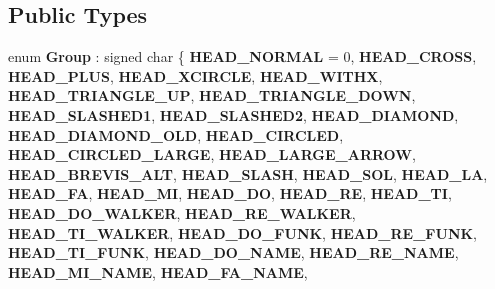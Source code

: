\subsection*{Public Types}
\begin{DoxyCompactItemize}
\item 
\mbox{\label{class_ms_1_1_note_head_a1d3e8faf3d3bc1d89d9d3485acde69d1}} 
enum {\bfseries Group} \+: signed char \{ \newline
{\bfseries H\+E\+A\+D\+\_\+\+N\+O\+R\+M\+AL} = 0, 
{\bfseries H\+E\+A\+D\+\_\+\+C\+R\+O\+SS}, 
{\bfseries H\+E\+A\+D\+\_\+\+P\+L\+US}, 
{\bfseries H\+E\+A\+D\+\_\+\+X\+C\+I\+R\+C\+LE}, 
\newline
{\bfseries H\+E\+A\+D\+\_\+\+W\+I\+T\+HX}, 
{\bfseries H\+E\+A\+D\+\_\+\+T\+R\+I\+A\+N\+G\+L\+E\+\_\+\+UP}, 
{\bfseries H\+E\+A\+D\+\_\+\+T\+R\+I\+A\+N\+G\+L\+E\+\_\+\+D\+O\+WN}, 
{\bfseries H\+E\+A\+D\+\_\+\+S\+L\+A\+S\+H\+E\+D1}, 
\newline
{\bfseries H\+E\+A\+D\+\_\+\+S\+L\+A\+S\+H\+E\+D2}, 
{\bfseries H\+E\+A\+D\+\_\+\+D\+I\+A\+M\+O\+ND}, 
{\bfseries H\+E\+A\+D\+\_\+\+D\+I\+A\+M\+O\+N\+D\+\_\+\+O\+LD}, 
{\bfseries H\+E\+A\+D\+\_\+\+C\+I\+R\+C\+L\+ED}, 
\newline
{\bfseries H\+E\+A\+D\+\_\+\+C\+I\+R\+C\+L\+E\+D\+\_\+\+L\+A\+R\+GE}, 
{\bfseries H\+E\+A\+D\+\_\+\+L\+A\+R\+G\+E\+\_\+\+A\+R\+R\+OW}, 
{\bfseries H\+E\+A\+D\+\_\+\+B\+R\+E\+V\+I\+S\+\_\+\+A\+LT}, 
{\bfseries H\+E\+A\+D\+\_\+\+S\+L\+A\+SH}, 
\newline
{\bfseries H\+E\+A\+D\+\_\+\+S\+OL}, 
{\bfseries H\+E\+A\+D\+\_\+\+LA}, 
{\bfseries H\+E\+A\+D\+\_\+\+FA}, 
{\bfseries H\+E\+A\+D\+\_\+\+MI}, 
\newline
{\bfseries H\+E\+A\+D\+\_\+\+DO}, 
{\bfseries H\+E\+A\+D\+\_\+\+RE}, 
{\bfseries H\+E\+A\+D\+\_\+\+TI}, 
{\bfseries H\+E\+A\+D\+\_\+\+D\+O\+\_\+\+W\+A\+L\+K\+ER}, 
\newline
{\bfseries H\+E\+A\+D\+\_\+\+R\+E\+\_\+\+W\+A\+L\+K\+ER}, 
{\bfseries H\+E\+A\+D\+\_\+\+T\+I\+\_\+\+W\+A\+L\+K\+ER}, 
{\bfseries H\+E\+A\+D\+\_\+\+D\+O\+\_\+\+F\+U\+NK}, 
{\bfseries H\+E\+A\+D\+\_\+\+R\+E\+\_\+\+F\+U\+NK}, 
\newline
{\bfseries H\+E\+A\+D\+\_\+\+T\+I\+\_\+\+F\+U\+NK}, 
{\bfseries H\+E\+A\+D\+\_\+\+D\+O\+\_\+\+N\+A\+ME}, 
{\bfseries H\+E\+A\+D\+\_\+\+R\+E\+\_\+\+N\+A\+ME}, 
{\bfseries H\+E\+A\+D\+\_\+\+M\+I\+\_\+\+N\+A\+ME}, 
\newline
{\bfseries H\+E\+A\+D\+\_\+\+F\+A\+\_\+\+N\+A\+ME}, 

\end{DoxyCompactItemize}
